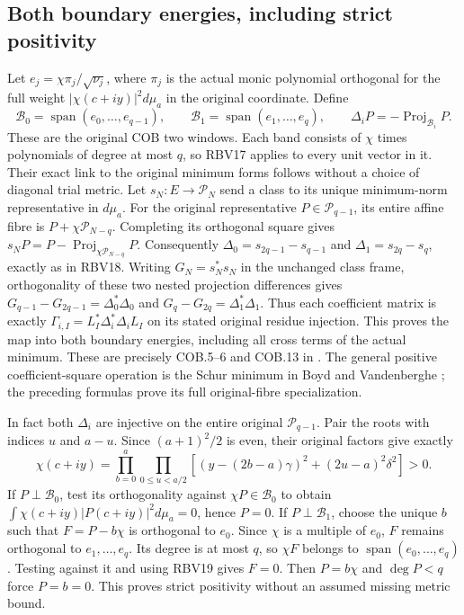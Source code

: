 \subsection{Both boundary energies, including strict positivity}
Let $e_j=\chi\pi_j/\sqrt{\nu_j}$, where $\pi_j$ is the actual
monic polynomial orthogonal for the full weight
$|\chi(c+iy)|^2d\mu_a$ in the original coordinate. Define
\[
\mathcal B_0=\operatorname{span}(e_0,\ldots,e_{q-1}),\qquad
\mathcal B_1=\operatorname{span}(e_1,\ldots,e_q),\qquad
\Delta_iP=-\operatorname{Proj}_{\mathcal B_i}P.
\tag{RBV18}
\]
These are the original COB two windows. Each band consists of
$\chi$ times polynomials of degree at most $q$, so RBV17 applies
to every unit vector in it.
Their exact link to the original minimum forms follows without a
choice of diagonal trial metric. Let $s_N:E\to\mathcal P_N$ send
a class to its unique minimum-norm representative in $d\mu_a$.
For the original representative $P\in\mathcal P_{q-1}$, its entire
affine fibre is $P+\chi\mathcal P_{N-q}$. Completing its orthogonal
square gives
$s_NP=P-\operatorname{Proj}_{\chi\mathcal P_{N-q}}P$.
Consequently
$\Delta_0=s_{2q-1}-s_{q-1}$ and
$\Delta_1=s_{2q}-s_q$, exactly as in RBV18.
Writing $G_N=s_N^*s_N$ in the unchanged class frame, orthogonality
of these two nested projection differences gives
$G_{q-1}-G_{2q-1}=\Delta_0^*\Delta_0$ and
$G_q-G_{2q}=\Delta_1^*\Delta_1$.
Thus each coefficient matrix is exactly
$\Gamma_{i,I}=L_I^*\Delta_i^*\Delta_iL_I$ on its stated original
residue injection. This proves the map into both boundary energies,
including all cross terms of the actual minimum.
These are precisely COB.5--6 and COB.13 in
. The general positive
coefficient-square operation is the Schur minimum in Boyd and
Vandenberghe \cite[Appendix A.5.5, p.~650]{human:boyd-vandenberghe};
the preceding formulas prove its full original-fibre specialization.

In fact both $\Delta_i$ are injective on the entire original
$\mathcal P_{q-1}$. Pair the roots with indices $u$ and $a-u$.
Since $(a+1)^2/2$ is even, their original factors give exactly
\[
\chi(c+iy)=\prod_{b=0}^a\prod_{0\le u<a/2}
\left[(y-(2b-a)\gamma)^2+(2u-a)^2\delta^2\right]>0.
\tag{RBV19}
\]
If $P\perp\mathcal B_0$, test its orthogonality against
$\chi P\in\mathcal B_0$ to obtain
$\int\chi(c+iy)|P(c+iy)|^2d\mu_a=0$, hence $P=0$.
If $P\perp\mathcal B_1$, choose the unique $b$ such that
$F=P-b\chi$ is orthogonal to $e_0$. Since $\chi$ is a multiple
of $e_0$, $F$ remains orthogonal to $e_1,\ldots,e_q$.
Its degree is at most $q$, so $\chi F$ belongs to
$\operatorname{span}(e_0,\ldots,e_q)$. Testing against it and using
RBV19 gives $F=0$. Then $P=b\chi$ and $\deg P<q$ force $P=b=0$.
This proves strict positivity without an assumed missing metric bound.

